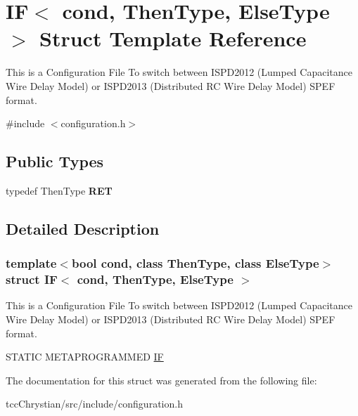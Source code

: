 \hypertarget{structIF}{\section{I\-F$<$ cond, Then\-Type, Else\-Type $>$ Struct Template Reference}
\label{structIF}
}


This is a Configuration File To switch between I\-S\-P\-D2012 (Lumped Capacitance Wire Delay Model) or I\-S\-P\-D2013 (Distributed R\-C Wire Delay Model) S\-P\-E\-F format.  




{\ttfamily \#include $<$configuration.\-h$>$}

\subsection*{Public Types}
\begin{DoxyCompactItemize}
\item 
\hypertarget{structIF_af93da5fd47eed555ff23c8d9022f8212}{typedef Then\-Type {\bfseries R\-E\-T}}\label{structIF_af93da5fd47eed555ff23c8d9022f8212}

\end{DoxyCompactItemize}


\subsection{Detailed Description}
\subsubsection*{template$<$bool cond, class Then\-Type, class Else\-Type$>$struct I\-F$<$ cond, Then\-Type, Else\-Type $>$}

This is a Configuration File To switch between I\-S\-P\-D2012 (Lumped Capacitance Wire Delay Model) or I\-S\-P\-D2013 (Distributed R\-C Wire Delay Model) S\-P\-E\-F format. 

S\-T\-A\-T\-I\-C M\-E\-T\-A\-P\-R\-O\-G\-R\-A\-M\-M\-E\-D \hyperlink{structIF}{I\-F} 

The documentation for this struct was generated from the following file\-:\begin{DoxyCompactItemize}
\item 
tcc\-Chrystian/src/include/configuration.\-h\end{DoxyCompactItemize}
